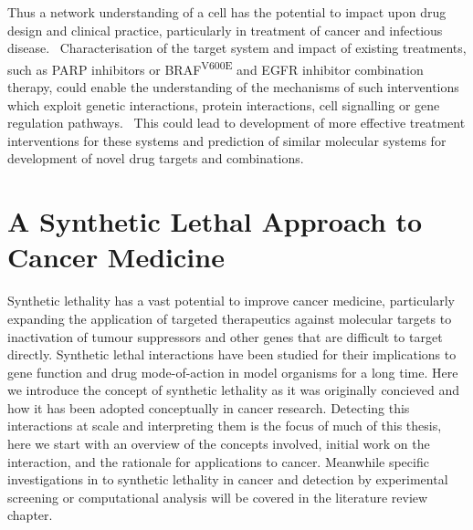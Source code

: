 Thus a network understanding of a cell has the potential to impact upon drug design and clinical practice, particularly in treatment of cancer and infectious disease. \ Characterisation of the target system and impact of existing treatments, such as PARP inhibitors or BRAF\textsuperscript{V600E} and EGFR inhibitor combination therapy, could enable the understanding of the mechanisms of such interventions which exploit genetic interactions, protein interactions, cell signalling or gene regulation pathways. \ This could lead to development of more effective treatment interventions for these systems and prediction of similar molecular systems for development of novel drug targets and combinations. \  



\section{A Synthetic Lethal Approach to Cancer Medicine}

Synthetic lethality has a vast potential to improve cancer medicine, particularly expanding the application of targeted therapeutics against molecular targets to inactivation of tumour suppressors and other genes that are difficult to target directly. Synthetic lethal interactions have been studied for their implications to gene function and drug mode-of-action in model organisms for a long time. Here we introduce the concept of synthetic lethality as it was originally concieved and how it has been adopted conceptually in cancer research. Detecting this interactions at scale and interpreting them is the focus of much of this thesis, here we start with an overview of the concepts involved, initial work on the interaction, and the rationale for applications to cancer. Meanwhile specific investigations in to synthetic lethality in cancer and detection by experimental screening or computational analysis will be covered in the literature review chapter.



